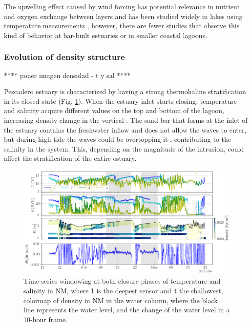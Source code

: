 \documentclass[tesis.tex]{subfiles}
\begin{document}
The upwelling effect caused by wind forcing has potential relevance in nutrient and oxygen exchange between layers \citep{Kelly2018} and has been studied widely in lakes using temperature measurements \citep{Coman2012, delafuente2010strong, roberts2021setup}, however, there are fewer studies that observe this kind of behavior at bar-built estuaries or in smaller coastal lagoons. \\

\subsubsection{Evolution of density structure}

**** poner imagen densidad - t y sal ****

 Pescadero estuary is characterized by having a strong thermohaline stratification in its closed state (Fig. \ref{fig:saltemp}). When the estuary inlet starts closing, temperature and salinity acquire different values on the top and bottom of the lagoon, increasing density change in the vertical \citep{largier2015}. The sand bar that forms at the inlet of the estuary contains the freshwater inflow and does not allow the waves to enter, but during high tide the waves could be overtopping it \citep{laudier2011measured}, contributing to the salinity in the system. This, depending on the magnitude of the intrusion, could affect the stratification of the entire estuary.\\

\begin{figure}[h!]
    \centering
    \includegraphics[scale=0.5]{Imagenes/saltemp.png}
    \caption{Time-series windowing at both closure phases of temperature and salinity in NM, where 1 is the deepest sensor and 4 the shallowest, colormap of density in NM in the water column, where the black line represents the water level, and the change of the water level in a 10-hour frame.}
    \label{fig:saltemp}
\end{figure}
\end{document}
